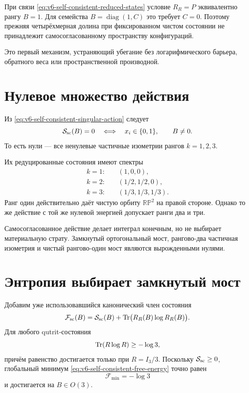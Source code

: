 \begin{theorem}
При связи \eqref{eq:v6-self-consistent-reduced-states} условие
$R_R=P$ эквивалентно рангу $B=1$. Для семейства
$B=\operatorname{diag}(1,C)$ это требует $C=0$. Поэтому прежняя
четырёхмерная долина при фиксированном чистом состоянии не принадлежит
самосогласованному пространству конфигураций.
\end{theorem}

Это первый механизм, устраняющий убегание без логарифмического барьера,
обратного веса или пространственной производной.

\section{Нулевое множество действия}

Из \eqref{eq:v6-self-consistent-singular-action} следует
\begin{equation}
 \mathcal S_{\rm sc}(B)=0
 \quad\Longleftrightarrow\quad
 x_i\in\{0,1\},\qquad B\ne0.
\end{equation}
То есть нули --- все ненулевые частичные изометрии рангов
$k=1,2,3$.

Их редуцированные состояния имеют спектры
\begin{align}
 k=1:&\quad(1,0,0),\\
 k=2:&\quad(1/2,1/2,0),\\
 k=3:&\quad(1/3,1/3,1/3).
\end{align}
Ранг один действительно даёт чистую орбиту $\mathbb{RP}^2$ на правой
стороне. Однако то же действие с той же нулевой энергией допускает ранги
два и три.

\begin{proposition}
Самосогласованное действие делает интеграл конечным, но не выбирает
материальную страту. Замкнутый ортогональный мост, рангово-два частичная
изометрия и чистый рангово-один мост являются вырожденными нулями.
\end{proposition}

\section{Энтропия выбирает замкнутый мост}

Добавим уже использовавшийся канонический член состояния
\begin{equation}
 \mathcal F_{\rm sc}(B)
 =\mathcal S_{\rm sc}(B)
 +\operatorname{Tr}\bigl(R_R(B)\log R_R(B)\bigr).
 \label{eq:v6-self-consistent-free-energy}
\end{equation}
Для любого qutrit-состояния
\begin{equation}
 \operatorname{Tr}(R\log R)\ge-\log3,
\end{equation}
причём равенство достигается только при $R=I_3/3$. Поскольку
$\mathcal S_{\rm sc}\ge0$, глобальный минимум
\eqref{eq:v6-self-consistent-free-energy} точно равен
\begin{equation}
 \mathcal F_{\min}=-\log3
\end{equation}
и достигается на $B\in O(3)$.

